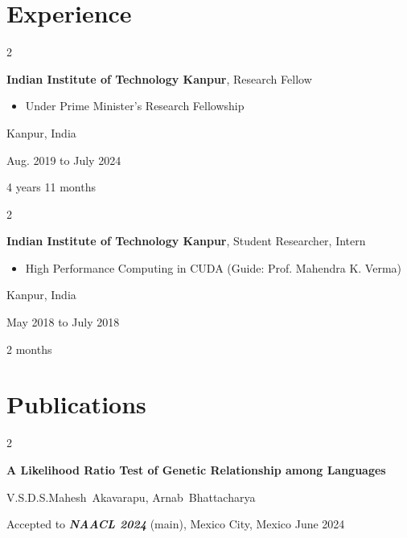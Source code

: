 \documentclass[10pt, letterpaper]{article}
\newenvironment{highlights}{
    \begin{itemize}[
        topsep=0.10 cm,
        parsep=0.10 cm,
        partopsep=0pt,
        itemsep=0pt,
        leftmargin=0.4 cm + 10pt
    ]
}{
    \end{itemize}
} %
\newenvironment{twocolentry}[2][]{
    \onecolentry
    \def\secondColumn{#2}
    \setcolumnwidth{\fill, 4.5 cm}
    \begin{paracol}{2}
}{
    \switchcolumn \raggedleft \secondColumn
    \end{paracol}
    \endonecolentry
} %
\begin{document}
    
    \section{Experience}



        
        \begin{twocolentry}{
            Kanpur, India

        Aug. 2019 to July 2024

        4 years 11 months
        }
            \textbf{Indian Institute of Technology Kanpur}, Research Fellow
            \begin{highlights}
                \item Under Prime Minister's Research Fellowship
            \end{highlights}
        \end{twocolentry}


        \vspace{0.2 cm}

        \begin{twocolentry}{
            Kanpur, India

        May 2018 to July 2018

        2 months
        }
            \textbf{Indian Institute of Technology Kanpur}, Student Researcher, Intern
            \begin{highlights}
                \item High Performance Computing in CUDA (Guide: Prof. Mahendra K. Verma)
            \end{highlights}
        \end{twocolentry}



    
    \section{Publications}



        
        \begin{samepage}
            \begin{twocolentry}{
                June 2024
            }
                \textbf{A Likelihood Ratio Test of Genetic Relationship among Languages}

                \vspace{0.10 cm}

                \mbox{V.S.D.S.Mahesh Akavarapu}, \mbox{Arnab Bhattacharya}
                \vspace{0.10 cm}

        Accepted to \textbf{\textit{NAACL 2024}} (main), Mexico City, Mexico    \end{twocolentry}
        \end{samepage}
\end{document}
